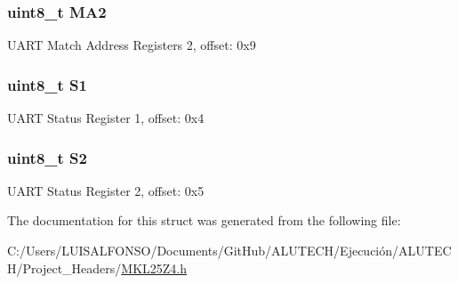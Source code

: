 \subsubsection[{M\+A2}]{\setlength{\rightskip}{0pt plus 5cm}uint8\+\_\+t M\+A2}\label{struct_u_a_r_t0___mem_map_adaf9bf1effbeb96d126fe9cf1bd0adb7}
U\+A\+R\+T Match Address Registers 2, offset\+: 0x9 \hypertarget{struct_u_a_r_t0___mem_map_a61370495fe05fc15ca074ec7a5c2d99f}{}
\subsubsection[{S1}]{\setlength{\rightskip}{0pt plus 5cm}uint8\+\_\+t S1}\label{struct_u_a_r_t0___mem_map_a61370495fe05fc15ca074ec7a5c2d99f}
U\+A\+R\+T Status Register 1, offset\+: 0x4 \hypertarget{struct_u_a_r_t0___mem_map_a7ff71460633a0ef4ba8d6a700d49b993}{}
\subsubsection[{S2}]{\setlength{\rightskip}{0pt plus 5cm}uint8\+\_\+t S2}\label{struct_u_a_r_t0___mem_map_a7ff71460633a0ef4ba8d6a700d49b993}
U\+A\+R\+T Status Register 2, offset\+: 0x5 

The documentation for this struct was generated from the following file\+:\begin{DoxyCompactItemize}
\item 
C\+:/\+Users/\+L\+U\+I\+S\+A\+L\+F\+O\+N\+S\+O/\+Documents/\+Git\+Hub/\+A\+L\+U\+T\+E\+C\+H/\+Ejecución/\+A\+L\+U\+T\+E\+C\+H/\+Project\+\_\+\+Headers/\hyperlink{_m_k_l25_z4_8h}{M\+K\+L25\+Z4.\+h}\end{DoxyCompactItemize}

